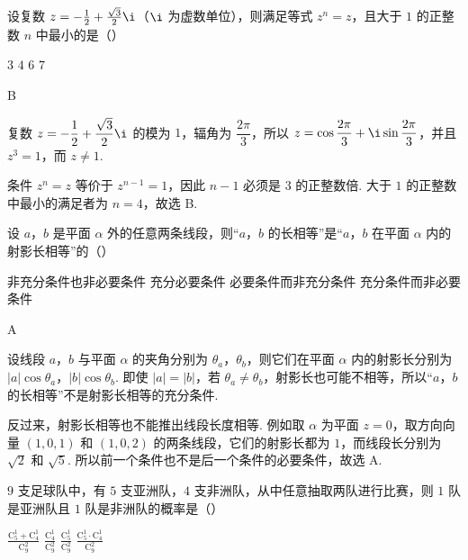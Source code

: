 \begin{problem}
设复数 \(z = -\frac{1}{2} + \frac{\sqrt{3}}{2}\i\)（\(\i\) 为虚数单位），则满足等式 \(z^n = z\)，且大于 \(1\) 的正整数 \(n\) 中最小的是（\quad）

\choices
    {\(3\)}
    {\(4\)}
    {\(6\)}
    {\(7\)}
\end{problem}

\begin{answer}
B
\end{answer}

\begin{solution}
复数 \(z=-\dfrac12+\dfrac{\sqrt3}{2}\i\) 的模为 \(1\)，辐角为 \(\dfrac{2\pi}{3}\)，所以 \(z=\cos\dfrac{2\pi}{3}+\i\sin\dfrac{2\pi}{3}\)，并且 \(z^3=1\)，而 \(z\ne1\).

条件 \(z^n=z\) 等价于 \(z^{n-1}=1\)，因此 \(n-1\) 必须是 \(3\) 的正整数倍. 大于 \(1\) 的正整数中最小的满足者为 \(n=4\)，故选 B.
\end{solution}

\begin{problem}
设 \(a\)，\(b\) 是平面 \(\alpha\) 外的任意两条线段，则“\(a\)，\(b\) 的长相等”是“\(a\)，\(b\) 在平面 \(\alpha\) 内的射影长相等”的（\quad）

\choices
    {非充分条件也非必要条件}
    {充分必要条件}
    {必要条件而非充分条件}
    {充分条件而非必要条件}
\end{problem}

\begin{answer}
A
\end{answer}

\begin{solution}
设线段 \(a\)，\(b\) 与平面 \(\alpha\) 的夹角分别为 \(\theta_a\)，\(\theta_b\)，则它们在平面 \(\alpha\) 内的射影长分别为 \(|a|\cos\theta_a\)，\(|b|\cos\theta_b\). 即使 \(|a|=|b|\)，若 \(\theta_a\ne\theta_b\)，射影长也可能不相等，所以“\(a\)，\(b\) 的长相等”不是射影长相等的充分条件.

反过来，射影长相等也不能推出线段长度相等. 例如取 \(\alpha\) 为平面 \(z=0\)，取方向向量 \((1,0,1)\) 和 \((1,0,2)\) 的两条线段，它们的射影长都为 \(1\)，而线段长分别为 \(\sqrt2\) 和 \(\sqrt5\). 所以前一个条件也不是后一个条件的必要条件，故选 A.
\end{solution}

\begin{problem}
\(9\) 支足球队中，有 \(5\) 支亚洲队，\(4\) 支非洲队，从中任意抽取两队进行比赛，则 \(1\) 队是亚洲队且 \(1\) 队是非洲队的概率是（\quad）

\choices
    {\(\frac{\mathrm C_5^1 + \mathrm C_4^1}{\mathrm C_9^2}\)}
    {\(\frac{\mathrm C_4^1}{\mathrm C_9^2}\)}
    {\(\frac{\mathrm C_5^1}{\mathrm C_9^2}\)}
    {\(\frac{\mathrm C_5^1 \cdot \mathrm C_4^1}{\mathrm C_9^2}\)}
\end{problem}

